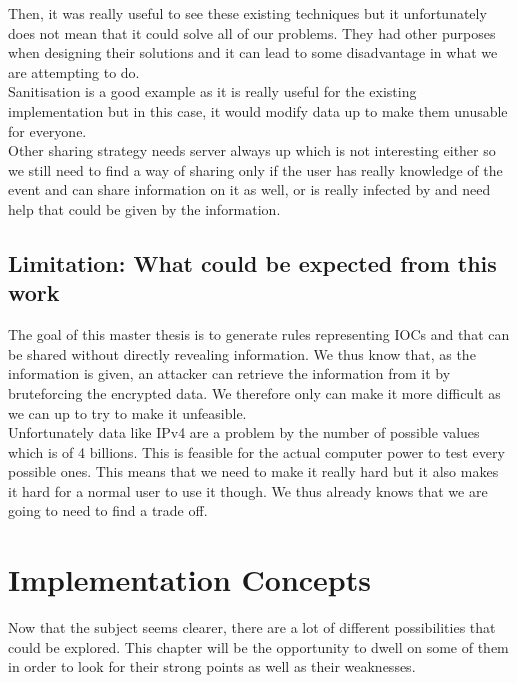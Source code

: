 \documentclass{eplmastersthesis}
\begin{document}
Then, it was really useful to see these existing techniques but it unfortunately does not mean that it could solve all of our problems. They had other purposes when designing their solutions and it can lead to some disadvantage in what we are attempting to do.\\
Sanitisation is a good example as it is really useful for the existing implementation but in this case, it would modify data up to make them unusable for everyone.\\
Other sharing strategy needs server always up which is not interesting either so we still need to find a way of sharing only if the user has really knowledge of the event and can share information on it as well, or is really infected by and need help that could be given by the information.\\


\section{Limitation: What could be expected from this work}

The goal of this master thesis is to generate rules representing IOCs and that can be shared without directly revealing information. We thus know that, as the information is given, an attacker can retrieve the information from it by bruteforcing the encrypted data. We therefore only can make it more difficult as we can up to try to make it unfeasible.\\
Unfortunately data like IPv4 are a problem by the number of possible values which is of 4 billions. This is feasible for the actual computer power to test every possible ones. This means that we need to make it really hard but it also makes it hard for a normal user to use it though. We thus already knows that we are going to need to find a trade off.

\chapter{Implementation Concepts}

Now that the subject seems clearer, there are a lot of different possibilities that could be explored. This chapter will be the opportunity to dwell on some of them in order to look for their strong points as well as their weaknesses.
\end{document}
